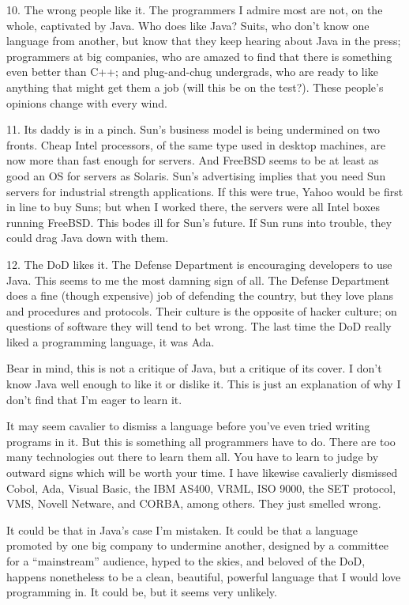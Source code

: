 \documentclass[12pt]{book}
\begin{document}
10. The wrong people like it. The programmers I admire most are not, on
the whole, captivated by Java. Who does like Java? Suits, who don't know
one language from another, but know that they keep hearing about Java in
the press; programmers at big companies, who are amazed to find that
there is something even better than C++; and plug-and-chug undergrads,
who are ready to like anything that might get them a job (will this be
on the test?). These people's opinions change with every wind.

11. Its daddy is in a pinch. Sun's business model is being undermined on
two fronts. Cheap Intel processors, of the same type used in desktop
machines, are now more than fast enough for servers. And FreeBSD seems
to be at least as good an OS for servers as Solaris. Sun's advertising
implies that you need Sun servers for industrial strength applications.
If this were true, Yahoo would be first in line to buy Suns; but when I
worked there, the servers were all Intel boxes running FreeBSD. This
bodes ill for Sun's future. If Sun runs into trouble, they could drag
Java down with them.

12. The DoD likes it. The Defense Department is encouraging developers
to use Java. This seems to me the most damning sign of all. The Defense
Department does a fine (though expensive) job of defending the country,
but they love plans and procedures and protocols. Their culture is the
opposite of hacker culture; on questions of software they will tend to
bet wrong. The last time the DoD really liked a programming language, it
was Ada.

Bear in mind, this is not a critique of Java, but a critique of its
cover. I don't know Java well enough to like it or dislike it. This is
just an explanation of why I don't find that I'm eager to learn it.

It may seem cavalier to dismiss a language before you've even tried
writing programs in it. But this is something all programmers have to
do. There are too many technologies out there to learn them all. You
have to learn to judge by outward signs which will be worth your time. I
have likewise cavalierly dismissed Cobol, Ada, Visual Basic, the IBM
AS400, VRML, ISO 9000, the SET protocol, VMS, Novell Netware, and CORBA,
among others. They just smelled wrong.

It could be that in Java's case I'm mistaken. It could be that a
language promoted by one big company to undermine another, designed by a
committee for a ``mainstream'' audience, hyped to the skies, and beloved
of the DoD, happens nonetheless to be a clean, beautiful, powerful
language that I would love programming in. It could be, but it seems
very unlikely.
\end{document}
